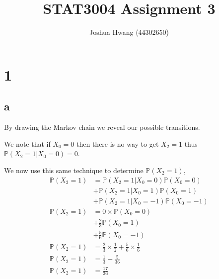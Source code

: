 \documentclass{article}
\title{STAT3004 Assignment 3}
\author{Joshua Hwang (44302650)}
\newcommand{\prob}{\mathbb{P}}
\begin{document}
\section{1}
\subsection{a}
By drawing the Markov chain we reveal our possible transitions.


We note that if $X_0 = 0$ then there is no way to get $X_2 = 1$ thus \\
$\prob(X_2 = 1 | X_0 = 0) = 0$.

We now use this same technique to determine $\prob(X_2 = 1)$,
\begin{align*}
    \prob(X_2 = 1) &= \prob(X_2 = 1 | X_0 = 0) \prob(X_0 = 0) \\
                   &+ \prob(X_2 = 1 | X_0 = 1) \prob(X_0 = 1) \\
                   &+ \prob(X_2 = 1 | X_0 = -1) \prob(X_0 = -1) \\
    \prob(X_2 = 1) &= 0 \times \prob(X_0 = 0) \\
                   &+ \frac{2}{3} \prob(X_0 = 1) \\
                   &+ \frac{5}{6} \prob(X_0 = -1) \\
    \prob(X_2 = 1) &= \frac{2}{3} \times \frac{1}{2}
                    + \frac{5}{6} \times \frac{1}{6} \\
    \prob(X_2 = 1) &= \frac{1}{3} + \frac{5}{36} \\
    \prob(X_2 = 1) &= \frac{17}{36} \\
\end{align*}
\end{document}
